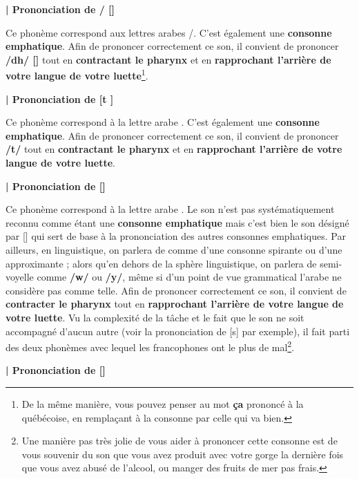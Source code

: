 \textbf{| Prononciation de / [\dh \super \textrevglotstop]}

Ce phonème correspond aux lettres arabes /. C'est également une \textbf{consonne emphatique}. Afin de prononcer correctement ce son, il convient de prononcer \textbf{/dh/ [\dh]} tout en \textbf{contractant le pharynx} et en \textbf{rapprochant l'arrière de votre langue de votre luette}\footnote{De la même manière, vous pouvez penser au mot \textbf{ça} prononcé à la québécoise, en remplaçant à la consonne par celle qui va bien.}. 


\textbf{| Prononciation de  [t \super \textrevglotstop]}

Ce phonème correspond à la lettre arabe . C'est également une \textbf{consonne emphatique}. Afin de prononcer correctement ce son, il convient de prononcer \textbf{/t/} tout en \textbf{contractant le pharynx} et en \textbf{rapprochant l'arrière de votre langue de votre luette}. 


\textbf{| Prononciation de  [\textrevglotstop]}

Ce phonème correspond à la lettre arabe . Le son n'est pas systématiquement reconnu comme étant une \textbf{consonne emphatique} mais c'est bien le son désigné par  [\textrevglotstop] qui sert de base à la prononciation des autres consonnes emphatiques. Par ailleurs, en linguistique, on parlera de  comme d'une consonne spirante ou d'une approximante ;  alors qu'en dehors de la sphère linguistique, on parlera de semi-voyelle comme \textbf{/w/} ou \textbf{/y/}, même si d'un point de vue grammatical l'arabe ne considère pas  comme telle. Afin de prononcer correctement ce son, il convient de \textbf{contracter le pharynx} tout en \textbf{rapprochant l'arrière de votre langue de votre luette}. Vu la complexité de la tâche et le fait que le son ne soit accompagné d'aucun autre (voir la prononciation de  [s\super \textrevglotstop] par exemple), il fait parti des deux phonèmes avec lequel les francophones ont le plus de mal\footnote{Une manière pas très jolie de vous aider à prononcer cette consonne est de vous souvenir du son que vous avez produit avec votre gorge la dernière fois que vous avez abusé de l'alcool, ou manger des fruits de mer pas frais.}.


\textbf{| Prononciation de  [\textinvscr]}

